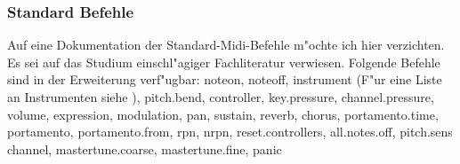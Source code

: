 \subsubsection{Standard Befehle}
Auf eine Dokumentation der Standard-Midi-Befehle m"ochte ich hier verzichten. Es sei
auf das Studium einschl"agiger Fachliteratur verwiesen. 
Folgende Befehle sind in der Erweiterung verf"ugbar: 
noteon,
noteoff,
instrument (F"ur eine Liste an Instrumenten siehe \cite{midi-inst}),
pitch.bend,
controller,
key.pressure,
channel.pressure,
volume,
expression,
modulation,
pan,
sustain,
reverb,
chorus,
portamento.time,
portamento,
portamento.from,
rpn,
nrpn,
reset.controllers,
all.notes.off,
pitch.sens channel,
mastertune.coarse,
mastertune.fine,
panic
